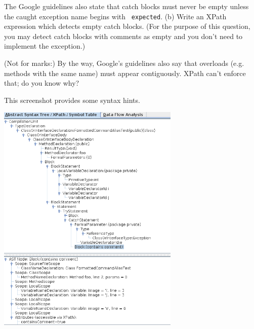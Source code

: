 \documentclass[12pt]{article}
\begin{document}
\vspace*{1em} \noindent
The Google guidelines also state that catch blocks must never be empty
unless the caught exception name begins with {\tt
  expected}. (b) Write an XPath expression which detects empty catch blocks.
(For the purpose of this question, you may detect catch blocks with comments
as empty and you don't need to implement the exception.)

\vspace*{1em} \noindent
(Not for marks:) By the way, Google's guidelines also say that overloads (e.g. methods with the same name) must
appear contiguously. XPath can't enforce that; do you know why? 

\vspace*{1em} \noindent
This screenshot provides some syntax hints.

\includegraphics[height=30em]{pmd1.png}

\newpage



\end{document}

